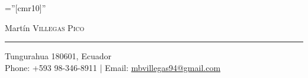 \documentclass[a4paper,10.9pt]{article}
\begin{document}
  




\font\fb=''[cmr10]'' %


\begin{center}
{ \Huge Martín \textsc{Villegas Pico}}
\end{center}
\textcolor{black!30}{\rule[.1\baselineskip]{\textwidth}{1pt}}

\begin{center}
Tungurahua 180601, Ecuador\\
Phone: +593 98-346-8911 | Email: \href{mailto:mbvillegas94@gmail.com}{mbvillegas94@gmail.com}
\end{center}


%

\end{document}

